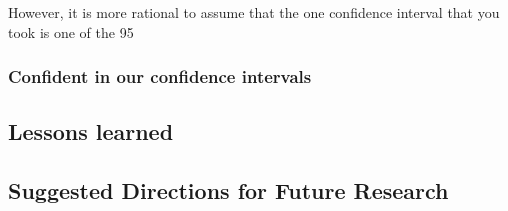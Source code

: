 However, it is more rational to assume that the one confidence interval that you took is one of the 95%

 \subsubsection{Confident in our confidence intervals}

\subsection{Lessons learned}
\subsection{Suggested Directions for Future Research}